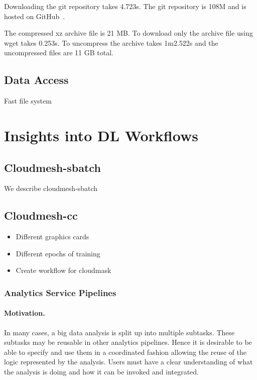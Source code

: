 \documentclass[utf8]{FrontiersinVancouver} %
\begin{document}
Downloading the git repository takes 4.723s. The git repository is 108M and
is hosted on GitHub~\cite{mlcommons-earthquake-data}.

The compressed xz archive file is 21 MB. To download only the archive file
using wget takes 0.253s.
To uncompress the archive takes 1m2.522s and the uncompressed files
are 11 GB total.


\subsection{Data Access}

Fast file system



\section{Insights into DL Workflows}





\subsection{Cloudmesh-sbatch}

We describe cloudmesh-sbatch

\subsection{Cloudmesh-cc}

\begin{itemize}
\item Different graphics cards

\item Different epochs of training

\item Create workflow for cloudmask
\end{itemize}


\subsubsection{Analytics Service Pipelines}

\paragraph{Motivation.}
In many cases, a big data analysis is split up into multiple
subtasks. These subtasks may be reusable in other analytics
pipelines. Hence it is desirable to be able to specify and use them in
a coordinated fashion allowing the reuse of the logic represented by the
analysis. Users must have a clear understanding of what the analysis
is doing and how it can be invoked and integrated.
\end{document}
